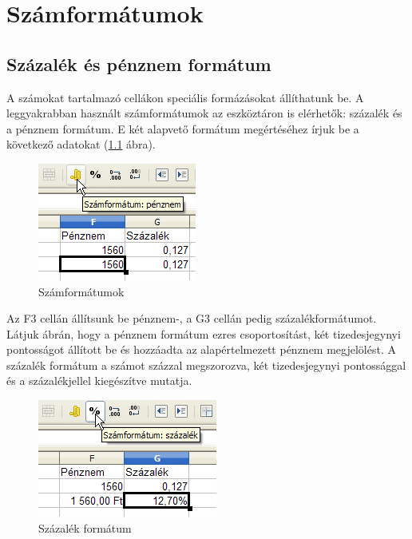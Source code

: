 \chapter{Számformátumok}
\thispagestyle{empty}

\section{Százalék és pénznem formátum}

A számokat tartalmazó cellákon speciális formázásokat
állíthatunk be. A leggyakrabban használt számformátumok az
eszköztáron is elérhetők: százalék és a pénznem
formátum. E két alapvető formátum megértéséhez írjuk
be a következő adatokat (\ref{Számformátumok} ábra).

\begin{figure}[!h]
\begin{center}
\includegraphics[width=5.211cm]{oocalcv1-img42.png}
\caption{Számformátumok}\label{Számformátumok}
\end{center}
\end{figure}

Az F3 cellán állítsunk be pénznem-, a G3 cellán pedig
százalékformátumot. Látjuk  ábrán, hogy a pénznem
formátum ezres csoportosítást, két tizedesjegynyi pontosságot
állított be és hozzáadta az alapértelmezett pénznem
megjelölést. A százalék formátum a számot százzal
megszorozva, két tizedesjegynyi pontossággal és a
százalékjellel kiegészítve mutatja.

\begin{figure}[!h]
\begin{center}
\includegraphics[width=5.898cm]{oocalcv1-img43.png}
\caption{Százalék formátum}\label{SzázalékFormátum}
\end{center}
\end{figure}


